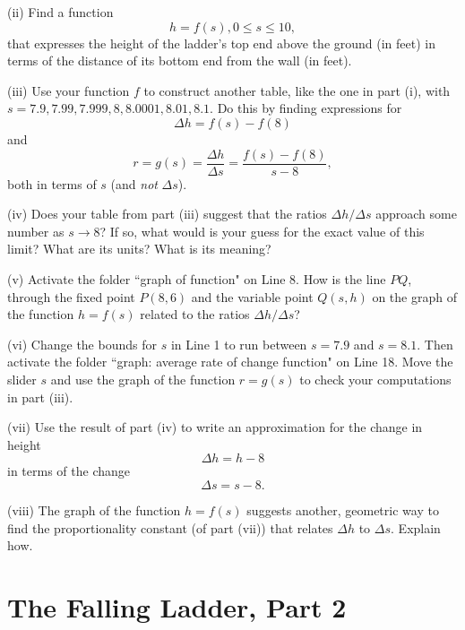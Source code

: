 \documentclass{ximera}
\begin{document}
\begin{example}
\begin{question}
(ii) Find a function
\[
  h = f(s) , 0\leq s \leq 10 ,
\]
that expresses the height of the ladder's top end above the ground (in feet) in terms of the distance of its bottom end from the wall (in feet). %

(iii) Use your function $f$ to construct another table, like the one in part (i), with $s=7.9, 7.99, 7.999,8, 8.0001, 8.01, 8.1$. Do this by finding expressions for 
\[
    \Delta h = f(s) - f(8)
\]
and
\[
   r = g(s) = \frac{\Delta h}{\Delta s} = \frac{f(s) - f(8)}{s-8} ,
\]
both in terms of $s$ (and \emph{not} $\Delta s$).

(iv) Does  your table from part (iii) suggest that the ratios $\Delta h/ \Delta s$ approach some number as $s\to 8$? If so, what would is your guess for the exact value of this limit? What are its units? What is its meaning?

(v) Activate the folder ``graph of function" on Line 8. How is the line $PQ$, through the fixed point $P(8,6)$ and the variable point $Q(s,h)$ on the graph of the function $h=f(s)$ related to the ratios $\Delta h / \Delta s$?

(vi) Change the bounds for $s$ in Line 1 to run between $s=7.9$ and $s=8.1$. Then activate the folder ``graph: average rate of change function" on Line 18. Move the slider $s$ and use the graph of the function $r=g(s)$ to check your computations in part (iii).

(vii) Use the result of part (iv) to write an approximation for the change in height
\[
   \Delta h = h-8
\]
in terms of the change
\[
  \Delta s = s - 8 .
\]  

(viii) The graph of the function $h=f(s)$ suggests another, geometric way to find the proportionality constant (of part (vii)) that relates $\Delta h$ to $\Delta s$. Explain how.

\end{question}

\end{example}

\section{The Falling Ladder, Part 2}
\end{document}
